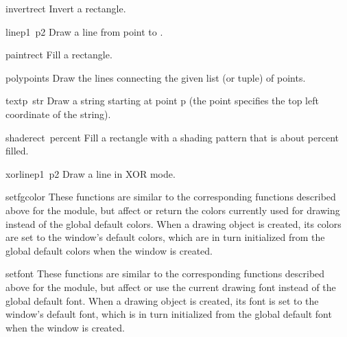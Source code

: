 \begin{funcdesc}{invert}{rect}
Invert a rectangle.
\end{funcdesc}

\begin{funcdesc}{line}{p1\, p2}
Draw a line from point
to
.
\end{funcdesc}

\begin{funcdesc}{paint}{rect}
Fill a rectangle.
\end{funcdesc}

\begin{funcdesc}{poly}{points}
Draw the lines connecting the given list (or tuple) of points.
\end{funcdesc}

\begin{funcdesc}{text}{p\, str}
Draw a string starting at point p (the point specifies the
top left coordinate of the string).
\end{funcdesc}

\begin{funcdesc}{shade}{rect\, percent}
Fill a rectangle with a shading pattern that is about
percent filled.
\end{funcdesc}

\begin{funcdesc}{xorline}{p1\, p2}
Draw a line in XOR mode.
\end{funcdesc}

\begin{funcdesc}{setfgcolor}{}
These functions are similar to the corresponding functions described
above for the
module, but affect or return the colors currently used for drawing
instead of the global default colors.
When a drawing object is created, its colors are set to the window's
default colors, which are in turn initialized from the global default
colors when the window is created.
\end{funcdesc}

\begin{funcdesc}{setfont}{}
These functions are similar to the corresponding functions described
above for the
module, but affect or use the current drawing font instead of
the global default font.
When a drawing object is created, its font is set to the window's
default font, which is in turn initialized from the global default
font when the window is created.
\end{funcdesc}

